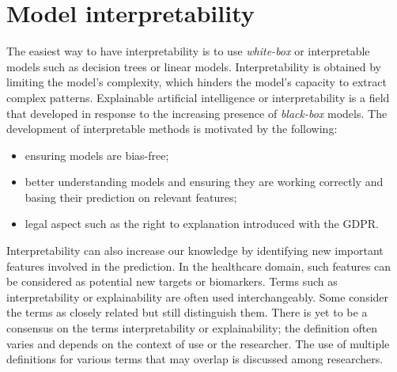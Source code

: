 \documentclass[../main.tex]{subfiles}
\begin{document}
\section{Model interpretability}
	The easiest way to have interpretability is to use \emph{white-box} or interpretable models such as decision trees or linear models.
	Interpretability is obtained by limiting the model's complexity, which hinders the model's capacity to extract complex patterns.
	Explainable artificial intelligence or interpretability is a field that developed in response to the increasing presence of \emph{black-box} models.
	The development of interpretable methods is motivated by the following:
	\begin{itemize}[nosep]
		\item ensuring models are bias-free;
		\item better understanding models and ensuring they are working correctly and basing their prediction on relevant features;
		\item legal aspect such as the right to explanation introduced with the GDPR\@.
	\end{itemize}
	Interpretability can also increase our knowledge by identifying new important features involved in the prediction.
	In the healthcare domain, such features can be considered as potential new targets or biomarkers.
	Terms such as interpretability or explainability are often used interchangeably.
	Some consider the terms as closely related but still distinguish them.
	There is yet to be a consensus on the terms interpretability or explainability; the definition often varies and depends on the context of use or the researcher.
	The use of multiple definitions for various terms that may overlap is discussed among researchers.
\end{document}
